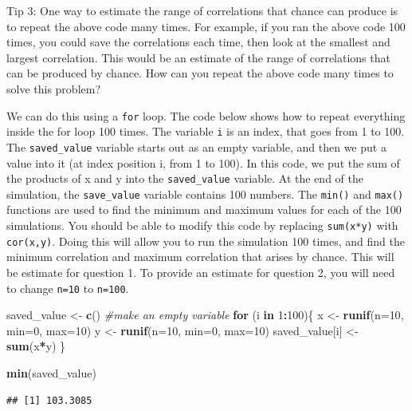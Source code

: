 \documentclass[]{book}
\newenvironment{Shaded}{\begin{snugshade}}{\end{snugshade}}
\newcommand{\KeywordTok}[1]{\textcolor[rgb]{0.13,0.29,0.53}{\textbf{#1}}}
\newcommand{\DataTypeTok}[1]{\textcolor[rgb]{0.13,0.29,0.53}{#1}}
\newcommand{\DecValTok}[1]{\textcolor[rgb]{0.00,0.00,0.81}{#1}}
\newcommand{\StringTok}[1]{\textcolor[rgb]{0.31,0.60,0.02}{#1}}
\newcommand{\CommentTok}[1]{\textcolor[rgb]{0.56,0.35,0.01}{\textit{#1}}}
\newcommand{\ControlFlowTok}[1]{\textcolor[rgb]{0.13,0.29,0.53}{\textbf{#1}}}
\newcommand{\OperatorTok}[1]{\textcolor[rgb]{0.81,0.36,0.00}{\textbf{#1}}}
\newcommand{\NormalTok}[1]{#1}
\begin{document}
Tip 3: One way to estimate the range of correlations that chance can
produce is to repeat the above code many times. For example, if you ran
the above code 100 times, you could save the correlations each time,
then look at the smallest and largest correlation. This would be an
estimate of the range of correlations that can be produced by chance.
How can you repeat the above code many times to solve this problem?

We can do this using a \texttt{for} loop. The code below shows how to
repeat everything inside the for loop 100 times. The variable \texttt{i}
is an index, that goes from 1 to 100. The \texttt{saved\_value} variable
starts out as an empty variable, and then we put a value into it (at
index position i, from 1 to 100). In this code, we put the sum of the
products of x and y into the \texttt{saved\_value} variable. At the end
of the simulation, the \texttt{save\_value} variable contains 100
numbers. The \texttt{min()} and \texttt{max()} functions are used to
find the minimum and maximum values for each of the 100 simulations. You
should be able to modify this code by replacing \texttt{sum(x*y)} with
\texttt{cor(x,y)}. Doing this will allow you to run the simulation 100
times, and find the minimum correlation and maximum correlation that
arises by chance. This will be estimate for question 1. To provide an
estimate for question 2, you will need to change \texttt{n=10} to
\texttt{n=100}.

\begin{Shaded}
\begin{Highlighting}[]
\NormalTok{saved_value <-}\StringTok{ }\KeywordTok{c}\NormalTok{() }\CommentTok{#make an empty variable}
\ControlFlowTok{for}\NormalTok{ (i }\ControlFlowTok{in} \DecValTok{1}\OperatorTok{:}\DecValTok{100}\NormalTok{)\{}
\NormalTok{  x <-}\StringTok{ }\KeywordTok{runif}\NormalTok{(}\DataTypeTok{n=}\DecValTok{10}\NormalTok{, }\DataTypeTok{min=}\DecValTok{0}\NormalTok{, }\DataTypeTok{max=}\DecValTok{10}\NormalTok{)}
\NormalTok{  y <-}\StringTok{ }\KeywordTok{runif}\NormalTok{(}\DataTypeTok{n=}\DecValTok{10}\NormalTok{, }\DataTypeTok{min=}\DecValTok{0}\NormalTok{, }\DataTypeTok{max=}\DecValTok{10}\NormalTok{)}
\NormalTok{  saved_value[i] <-}\StringTok{ }\KeywordTok{sum}\NormalTok{(x}\OperatorTok{*}\NormalTok{y)}
\NormalTok{\}}

\KeywordTok{min}\NormalTok{(saved_value)}
\end{Highlighting}
\end{Shaded}

\begin{verbatim}
## [1] 103.3085
\end{verbatim}
\end{document}
